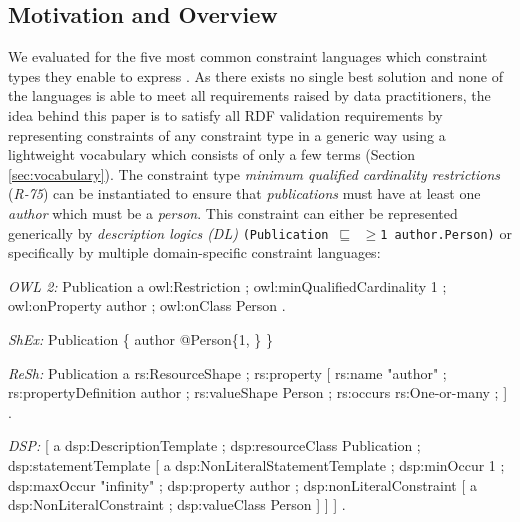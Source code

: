 \documentclass[a4paper,fontsize=11pt]{scrartcl}
\newcommand{\ms}[1]{\texttt{#1}}
\begin{document}
\subsection{Motivation and Overview}

We evaluated for the five most common constraint languages which constraint types they enable to express \cite{BoschNolleAcarEckert2015}.
As there exists no single best solution and none of the languages is able to meet all requirements raised by data practitioners,
the idea behind this paper is to satisfy all RDF validation requirements
by representing constraints of any constraint type in a generic way using a lightweight vocabulary which consists of only a few terms (Section \ref{sec:vocabulary}).
The constraint type \emph{minimum qualified cardinality restrictions} (\emph{R-75}) can be instantiated to ensure
that \emph{publications} must have at least one \emph{author} which must be a \emph{person}.
This constraint can either be represented generically by \emph{description logics (DL)} {\small\ms{(Publication $\sqsubseteq$ $\geq$1 author.Person)}} or specifically by multiple domain-specific constraint languages:

\begin{ex}[commandchars=\\\{\}]
\textit{OWL 2:}
Publication
    a owl:Restriction ;
    owl:minQualifiedCardinality 1 ;
    owl:onProperty author ;
    owl:onClass Person .
		
\textit{ShEx:}
Publication \{ author @Person\{1, \} \}

\textit{ReSh:}
Publication a rs:ResourceShape ; rs:property [
    rs:name "author" ; rs:propertyDefinition author ;
    rs:valueShape Person ;
    rs:occurs rs:One-or-many ; ] .
		
\textit{DSP:}
[   a dsp:DescriptionTemplate ; 
    dsp:resourceClass Publication ; 
    dsp:statementTemplate [ a dsp:NonLiteralStatementTemplate ;
        dsp:minOccur 1 ; dsp:maxOccur "infinity" ; 
        dsp:property author ; 
        dsp:nonLiteralConstraint [ a dsp:NonLiteralConstraint ;
            dsp:valueClass Person ] ] ] .
\end{ex}
\end{document}
